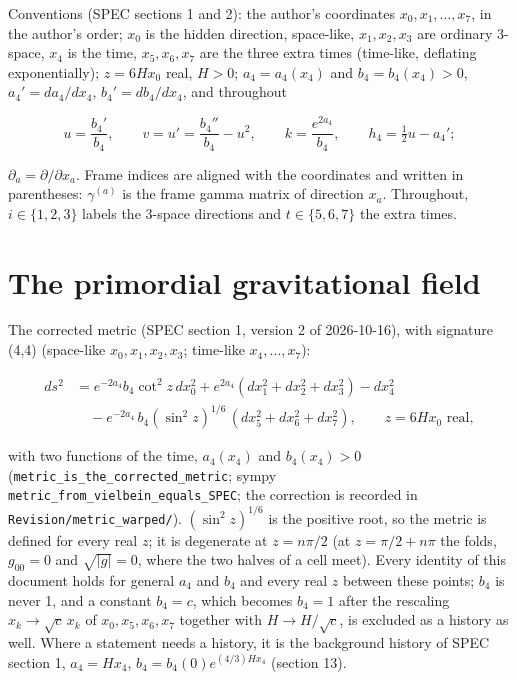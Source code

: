 \documentclass[11pt]{article}
\begin{document}
Conventions (SPEC sections 1 and 2): the author's coordinates $x_0, x_1, \dots, x_7$, in the author's order; $x_0$ is the hidden direction, space-like, $x_1, x_2, x_3$ are ordinary 3-space, $x_4$ is the time, $x_5, x_6, x_7$ are the three extra times (time-like, deflating exponentially); $z = 6Hx_0$ real, $H > 0$; $a_4 = a_4(x_4)$ and $b_4 = b_4(x_4) > 0$, $a_4' = da_4/dx_4$, $b_4' = db_4/dx_4$, and throughout

\[
u = \frac{b_4'}{b_4},\qquad v = u' = \frac{b_4''}{b_4} - u^2,\qquad k = \frac{e^{2a_4}}{b_4},\qquad h_4 = \tfrac12u - a_4' ;
\]

$\partial_a = \partial/\partial x_a$. Frame indices are aligned with the coordinates and written in parentheses: $\gamma^{(a)}$ is the frame gamma matrix of direction $x_a$. Throughout, $i \in \{1, 2, 3\}$ labels the 3-space directions and $t \in \{5, 6, 7\}$ the extra times.

\section{The primordial gravitational field}

The corrected metric (SPEC section 1, version 2 of 2026-10-16), with signature (4,4) (space-like $x_0, x_1, x_2, x_3$; time-like $x_4, \dots, x_7$):

\[
\begin{aligned}
ds^2 &= e^{-2a_4}b_4\cot^2 z\,dx_0^2 + e^{2a_4}(dx_1^2 + dx_2^2 + dx_3^2) - dx_4^2 \\
&\quad - e^{-2a_4}\,b_4(\sin^2 z)^{1/6}\,(dx_5^2 + dx_6^2 + dx_7^2), \qquad z = 6Hx_0 \text{ real},
\end{aligned}
\]

with two functions of the time, $a_4(x_4)$ and $b_4(x_4) > 0$ (\texttt{metric\_i\allowbreak{}s\_the\_co\allowbreak{}rrected\_\allowbreak{}metric}; sympy \texttt{metric\_f\allowbreak{}rom\_viel\allowbreak{}bein\_equ\allowbreak{}als\_SPEC}; the correction is recorded in \texttt{Revision\allowbreak{}/metric\_\allowbreak{}warped/}). $(\sin^2 z)^{1/6}$ is the positive root, so the metric is defined for every real $z$; it is degenerate at $z = n\pi/2$ (at $z = \pi/2 + n\pi$ the folds, $g_{00} = 0$ and $\sqrt{|g|} = 0$, where the two halves of a cell meet). Every identity of this document holds for general $a_4$ and $b_4$ and every real $z$ between these points; $b_4$ is never 1, and a constant $b_4 = c$, which becomes $b_4 = 1$ after the rescaling $x_k \to \sqrt{c}\,x_k$ of $x_0, x_5, x_6, x_7$ together with $H \to H/\sqrt{c}$, is excluded as a history as well. Where a statement needs a history, it is the background history of SPEC section 1, $a_4 = Hx_4$, $b_4 = b_4(0)e^{(4/3)Hx_4}$ (section 13).
\end{document}
